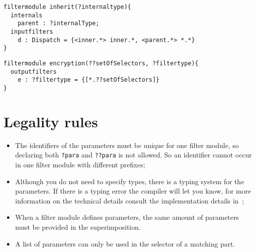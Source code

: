 \begin{lstlisting}[caption={Example of a generic inheritance filter module}, label = lst::ARM:fmp:example2,
style = listing, language=ComposeStar, float = tpb]
filtermodule inherit(?internaltype){
  internals
    parent : ?internalType;
  inputfilters
    d : Dispatch = {<inner.*> inner.*, <parent.*> *.*}
} 
\end{lstlisting}

\begin{lstlisting}[caption = {Example of an encryption filter}, label = lst::ARM:fmp:example3,
style = listing, language =ComposeStar, float = tpb]
filtermodule encryption(??setOfSelectors, ?filtertype){
  outputfilters
    e : ?filtertype = {[*.??setOfSelectors]}
} 
\end{lstlisting}

\section{Legality rules}
\begin{itemize}[noitemsep]
\item The identifiers of the parameters must be unique for one filter module, so declaring both \lstinline!?para!
and \lstinline!??para! is not allowed. 
So an identifier cannot occur in one filter module with different prefixes;
\item Although you do not need to specify types, there is a typing system for the parameters. 
If there is a typing error the compiler will let you know, for more information on the technical details consult
the implementation details in~\cite{Doornenbal2006};
\item When a filter module defines parameters, the same amount of parameters must be provided in the superimposition.
\item A list of parameters can only be used in the selector of a matching part.
\end{itemize}


